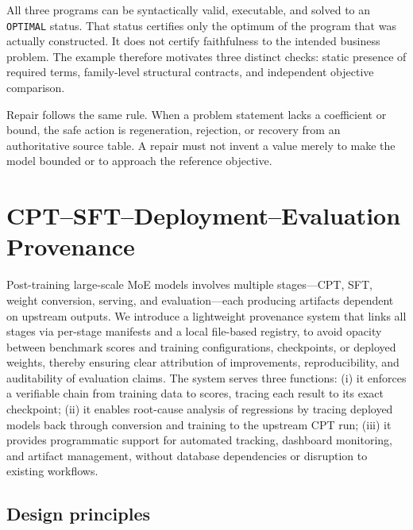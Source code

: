 All three programs can be syntactically valid, executable, and solved to an
\texttt{OPTIMAL} status.  That status certifies only the optimum of the program
that was actually constructed.  It does not certify faithfulness to the
intended business problem.  The example therefore motivates three distinct
checks: static presence of required terms, family-level structural contracts,
and independent objective comparison.

Repair follows the same rule.  When a problem statement lacks a coefficient or
bound, the safe action is regeneration, rejection, or recovery from an
authoritative source table.  A repair must not invent a value merely to make the
model bounded or to approach the reference objective.

\section{CPT--SFT--Deployment--Evaluation Provenance}
\label{app:provenance}

Post-training large-scale MoE models involves multiple stages—CPT, SFT, weight conversion, serving, and evaluation—each producing artifacts dependent on upstream outputs. We introduce a lightweight provenance system that links all stages via per-stage manifests and a local file-based registry, to avoid opacity between benchmark scores and training configurations, checkpoints, or deployed weights, thereby ensuring clear attribution of improvements, reproducibility, and auditability of evaluation claims. The system serves three functions: (i) it enforces a verifiable chain from training data to scores, tracing each result to its exact checkpoint; (ii) it enables root-cause analysis of regressions by tracing deployed models back through conversion and training to the upstream CPT run; (iii) it provides programmatic support for automated tracking, dashboard monitoring, and artifact management, without database dependencies or disruption to existing workflows.

\subsection{Design principles}

